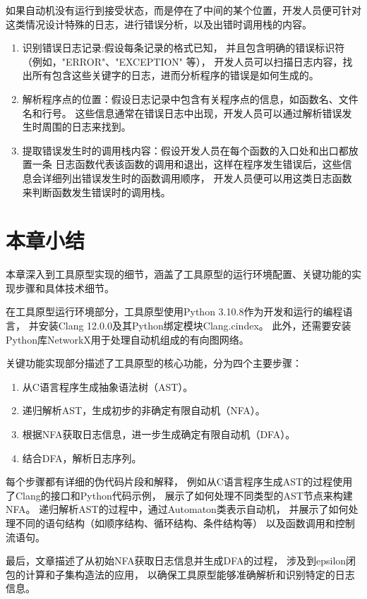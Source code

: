 如果自动机没有运行到接受状态，而是停在了中间的某个位置，开发人员便可针对
这类情况设计特殊的日志，进行错误分析，以及出错时调用栈的内容。
\begin{enumerate}
    \item 识别错误日志记录:假设每条记录的格式已知，
    并且包含明确的错误标识符（例如，"ERROR"、"EXCEPTION" 等），
    开发人员可以扫描日志内容，找出所有包含这些关键字的日志，进而分析程序的错误是如何生成的。
    \item 解析程序点的位置：假设日志记录中包含有关程序点的信息，如函数名、文件名和行号。
    这些信息通常在错误日志中出现，开发人员可以通过解析错误发生时周围的日志来找到。
    \item 提取错误发生时的调用栈内容：假设开发人员在每个函数的入口处和出口都放置一条
    日志函数代表该函数的调用和退出，这样在程序发生错误后，这些信息会详细列出错误发生时的函数调用顺序，
    开发人员便可以用这类日志函数来判断函数发生错误时的调用栈。
\end{enumerate}

\section{本章小结}
本章深入到工具原型实现的细节，涵盖了工具原型的运行环境配置、关键功能的实现步骤和具体技术细节。

在工具原型运行环境部分，工具原型使用Python 3.10.8作为开发和运行的编程语言，
并安装Clang 12.0.0及其Python绑定模块Clang.cindex。
此外，还需要安装Python库NetworkX用于处理自动机组成的有向图网络。

关键功能实现部分描述了工具原型的核心功能，分为四个主要步骤：
\begin{enumerate}
    \item 从C语言程序生成抽象语法树（AST）。
    \item 递归解析AST，生成初步的非确定有限自动机（NFA）。
    \item 根据NFA获取日志信息，进一步生成确定有限自动机（DFA）。
    \item 结合DFA，解析日志序列。
\end{enumerate}

每个步骤都有详细的伪代码片段和解释，
例如从C语言程序生成AST的过程使用了Clang的接口和Python代码示例，
展示了如何处理不同类型的AST节点来构建NFA。
递归解析AST的过程中，通过Automaton类表示自动机，
并展示了如何处理不同的语句结构（如顺序结构、循环结构、条件结构等）
以及函数调用和控制流语句。

最后，文章描述了从初始NFA获取日志信息并生成DFA的过程，
涉及到epsilon闭包的计算和子集构造法的应用，
以确保工具原型能够准确解析和识别特定的日志信息。



